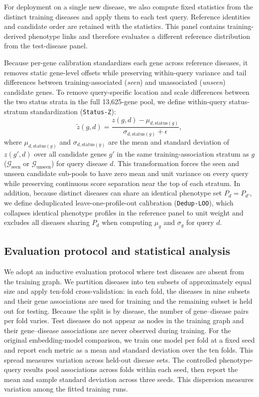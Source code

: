 \documentclass[webpdf,contemporary,large]{oup-authoring-template}%
\theoremstyle{thmstyleone}%
\theoremstyle{thmstyletwo}%
\theoremstyle{thmstylethree}%
\begin{document}
For deployment on a single new disease, we also compute fixed statistics from
the distinct training diseases and apply them to each test query. Reference
identities and candidate order are retained with the statistics. This panel
contains training-derived phenotype links and therefore evaluates a different
reference distribution from the test-disease panel.

Because per-gene calibration standardizes each gene across reference diseases,
it removes static gene-level offsets while preserving within-query variance and
tail differences between training-associated (\emph{seen}) and unassociated
(\emph{unseen}) candidate genes. To remove query-specific location and scale
differences between the two status strata in the full 13{,}625-gene pool, we
define within-query status-stratum standardization (\texttt{Status-Z}):
\begin{equation}
  \label{eq:status_z}
  \tilde{z}(g, d) = \frac{z(g, d) - \mu_{d,\mathrm{status}(g)}}{\sigma_{d,\mathrm{status}(g)} + \epsilon},
\end{equation}
where $\mu_{d,\mathrm{status}(g)}$ and $\sigma_{d,\mathrm{status}(g)}$ are the
mean and standard deviation of $z(g', d)$ over all candidate genes $g'$ in the
same training-association stratum as $g$ ($\mathcal{G}_{\mathrm{seen}}$ or
$\mathcal{G}_{\mathrm{unseen}}$) for query disease $d$. This transformation
forces the seen and unseen candidate sub-pools to have zero mean and unit
variance on every query while preserving continuous score separation near the
top of each stratum. In addition, because distinct diseases can share an
identical phenotype set $P_d = P_{d'}$, we define deduplicated
leave-one-profile-out calibration (\texttt{Dedup-LOO}), which collapses
identical phenotype profiles in the reference panel to unit weight and excludes
all diseases sharing $P_d$ when computing $\mu_g$ and $\sigma_g$ for query $d$.

\subsection{Evaluation protocol and statistical analysis}
\label{sec:eval}

We adopt an inductive evaluation
protocol where test diseases are absent from the training graph. We
partition diseases into ten subsets of approximately equal size and
apply ten-fold cross-validation: in each fold, the diseases in nine
subsets and their gene associations are used for training and the
remaining subset is held out for testing. Because the split is by
disease, the number of gene--disease pairs per fold varies. Test
diseases do not appear as nodes in the training graph and their
gene--disease associations are never observed during training. For the original
embedding-model comparison, we train one model per fold at a fixed seed and
report each metric as a mean and standard deviation over the ten folds.
This spread measures variation across held-out disease sets. The
controlled phenotype-query results pool associations across folds within each
seed, then report the mean and sample standard deviation across three seeds.
This dispersion measures variation among the fitted training runs.
\end{document}
